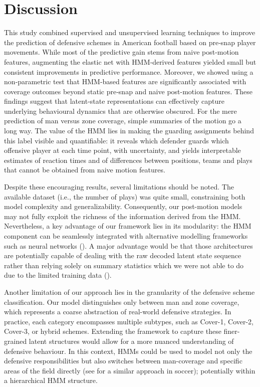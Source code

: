\documentclass[namedate,webpdf,modern,medium]{oup-authoring-template}
\begin{document}
\section{Discussion}\label{sec:discussion}

This study combined supervised and unsupervised learning techniques to improve the prediction of defensive schemes in American football based on pre‑snap player movements. While most of the predictive gain stems from naive post-motion features, augmenting the elastic net with HMM‑derived features yielded small but consistent improvements in predictive performance. Moreover, we showed using a non‑parametric test that HMM-based features are significantly associated with coverage outcomes beyond static pre‑snap and naive post-motion features. These findings suggest that latent‑state representations can effectively capture underlying behavioural dynamics that are otherwise obscured. For the mere prediction of man versus zone coverage, simple summaries of the motion go a long way. The value of the HMM lies in making the guarding assignments behind this label visible and quantifiable: it reveals which defender guards which offensive player at each time point, with uncertainty, and yields interpretable estimates of reaction times and of differences between positions, teams and plays that cannot be obtained from naive motion features.

Despite these encouraging results, several limitations should be noted. The available dataset (i.e., the number of plays) was quite small, constraining both model complexity and generalizability. Consequently, our post-motion models may not fully exploit the richness of the information derived from the HMM. Nevertheless, a key advantage of our framework lies in its modularity: the HMM component can be seamlessly integrated with alternative modelling frameworks such as neural networks (\citealp{Song2023}). A major advantage would be that those architectures are potentially capable of dealing with the raw decoded latent state sequence rather than relying solely on summary statistics which we were not able to do due to the limited training data (\citealp{dempster2020rocket}). 

Another limitation of our approach lies in the granularity of the defensive scheme classification. Our model distinguishes only between man and zone coverage, which represents a coarse abstraction of real-world defensive strategies. In practice, each category encompasses multiple subtypes, such as Cover-1, Cover-2, Cover-3, or hybrid schemes. Extending the framework to capture these finer-grained latent structures would allow for a more nuanced understanding of defensive behaviour. In this context, HMMs could be used to model not only the defensive responsibilities but also switches between man-coverage and specific areas of the field directly (see \citealp{groom} for a similar approach in soccer); potentially within a hierarchical HMM structure.
\end{document}

